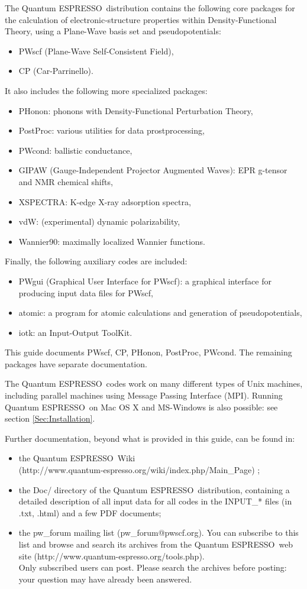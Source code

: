\documentclass[12pt,a4paper]{article}
\def\qe{{\sc Quantum ESPRESSO}}
\begin{document}
The \qe\ distribution contains the following core packages 
for the calculation of electronic-structure properties within
Density-Functional Theory, using a Plane-Wave basis set and pseudopotentials:
\begin{itemize}
  \item PWscf (Plane-Wave Self-Consistent Field),
  \item CP (Car-Parrinello).
\end{itemize}
It also includes the following more specialized packages:
\begin{itemize}
  \item PHonon:
        phonons with Density-Functional Perturbation Theory,
  \item PostProc: various utilities for data prostprocessing,
  \item PWcond:
        ballistic conductance,
  \item GIPAW  (Gauge-Independent Projector Augmented Waves):
        EPR g-tensor and NMR chemical shifts,
  \item XSPECTRA:
        K-edge X-ray adsorption spectra,
  \item vdW:
        (experimental) dynamic polarizability, 
  \item Wannier90:
        maximally localized Wannier functions.
\end{itemize}
Finally, the following auxiliary codes are included:
\begin{itemize}
\item PWgui (Graphical User Interface for PWscf): 
      a graphical interface for producing input data files for PWscf,
\item atomic: 
      a program for atomic calculations and generation of pseudopotentials,
\item iotk:
      an Input-Output ToolKit.
\end{itemize}
This guide documents PWscf, CP, PHonon, PostProc, PWcond. 
The remaining packages have separate documentation.

The \qe\ codes work on many different types of 
Unix machines,
including parallel machines using Message Passing Interface (MPI).
Running \qe\ on Mac OS X and MS-Windows is also possible: 
see section \ref{Sec:Installation}.

Further documentation, beyond what is provided in this guide, can be found in:
\begin{itemize}
  \item the \qe\ Wiki\\
   (http://www.quantum-espresso.org/wiki/index.php/Main\_Page) ;
  \item the Doc/ directory of the \qe\ distribution,
   containing a detailed description of all input data for all codes
   in the INPUT\_* files (in .txt, .html) and a few PDF documents;
\item the pw\_forum mailing list (pw\_forum@pwscf.org).
   You can subscribe to this list and browse and search its archives 
   from the \qe\ web site 
   (http://www.quantum-espresso.org/tools.php).\\
   Only subscribed users can post. Please search the archives 
   before posting: your question may have already been answered.
\end{itemize}
\end{document}
